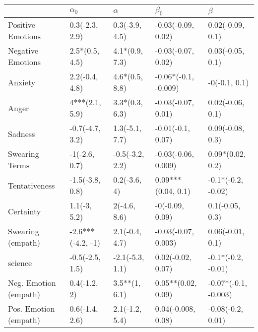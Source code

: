 \begin{tabular}{lllll}
\toprule
{} &         $\alpha_0$ &         $\alpha$ &             $\beta_0$ &               $\beta$ \\
\midrule
Positive Emotions     &     0.3(-2.3, 2.9) &   0.3(-3.9, 4.5) &    -0.03(-0.09, 0.02) &      0.02(-0.09, 0.1) \\
Negative Emotions     &     2.5*(0.5, 4.5) &   4.1*(0.9, 7.3) &    -0.03(-0.07, 0.02) &      0.03(-0.05, 0.1) \\
Anxiety               &     2.2(-0.4, 4.8) &   4.6*(0.5, 8.8) &  -0.06*(-0.1, -0.009) &         -0(-0.1, 0.1) \\
Anger                 &     4***(2.1, 5.9) &   3.3*(0.3, 6.3) &    -0.03(-0.07, 0.01) &      0.02(-0.06, 0.1) \\
Sadness               &    -0.7(-4.7, 3.2) &   1.3(-5.1, 7.7) &     -0.01(-0.1, 0.07) &      0.09(-0.08, 0.3) \\
Swearing Terms        &      -1(-2.6, 0.7) &  -0.5(-3.2, 2.2) &   -0.03(-0.06, 0.009) &      0.09*(0.02, 0.2) \\
Tentativeness         &    -1.5(-3.8, 0.8) &     0.2(-3.6, 4) &    0.09***(0.04, 0.1) &    -0.1*(-0.2, -0.02) \\
Certainty             &       1.1(-3, 5.2) &     2(-4.6, 8.6) &       -0(-0.09, 0.09) &       0.1(-0.05, 0.3) \\
Swearing (empath)     &  -2.6***(-4.2, -1) &   2.1(-0.4, 4.7) &   -0.03(-0.07, 0.003) &      0.06(-0.01, 0.1) \\
science               &    -0.5(-2.5, 1.5) &  -2.1(-5.3, 1.1) &     0.02(-0.02, 0.07) &    -0.1*(-0.2, -0.01) \\
Neg. Emotion (empath) &       0.4(-1.2, 2) &    3.5**(1, 6.1) &    0.05**(0.02, 0.09) &  -0.07*(-0.1, -0.003) \\
Pos. Emotion (empath) &     0.6(-1.4, 2.6) &   2.1(-1.2, 5.4) &    0.04(-0.008, 0.08) &     -0.08(-0.2, 0.01) \\
\bottomrule
\end{tabular}

